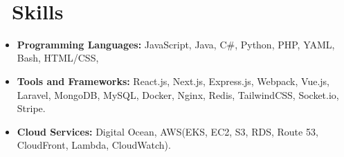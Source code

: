 \documentclass{resume}
\begin{document}


   \textperiodcentered\

  \section{\faCogs\ Skills}
  \begin{itemize}[parsep=0.5ex]
    \item \textbf{Programming Languages:} JavaScript, Java, C\#, Python, PHP, YAML, Bash, HTML/CSS,
    \item \textbf{Tools and Frameworks:} React.js, Next.js, Express.js, Webpack, Vue.js, Laravel, MongoDB, MySQL, Docker, Nginx, Redis, TailwindCSS, Socket.io, Stripe.
    \item \textbf{Cloud Services:} Digital Ocean, AWS(EKS, EC2, S3, RDS, Route 53, CloudFront, Lambda, CloudWatch).
  \end{itemize}
  
  
\end{document}
